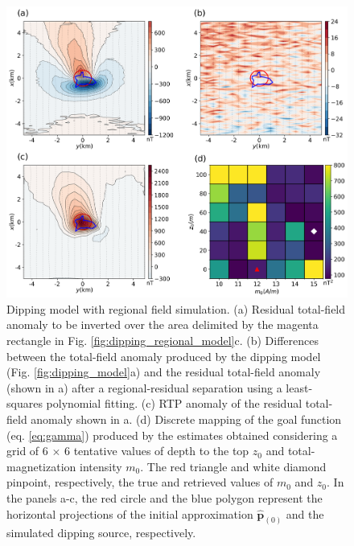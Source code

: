 \begin{figure}
    \centering
    \includegraphics[width=\linewidth]{figures/regional_rtp.png}
    \caption{Dipping model with regional field simulation. (a) Residual total-field anomaly to be inverted over the area delimited by the  magenta rectangle 
    in Fig. \ref{fig:dipping_regional_model}c. 
    (b) Differences between the total-field anomaly produced by the dipping model
(Fig. \ref{fig:dipping_model}a) and the residual total-field anomaly (shown in a) after a regional-residual separation using a least-squares polynomial fitting. 
(c) RTP anomaly of the  residual total-field anomaly shown in a. 
(d) Discrete mapping of the goal function (eq. \ref{eq:gamma}) produced by the estimates   	       obtained considering a grid of 6 $\times$ 6 tentative values of 
	   depth to the top $z_0$ and total-magnetization intensity $m_0$. 
	   The red triangle  and white diamond pinpoint, respectively, the true and retrieved 	   
	   values of $m_0$  and $z_0$.   
	   In the panels a-c, the red circle and the blue polygon represent the horizontal projections 	of the initial approximation $\hat{\mathbf{p}}_{(0)}$ and  the simulated dipping source, respectively.
}
    \label{fig:dipping_regional_rtp}
\end{figure}


